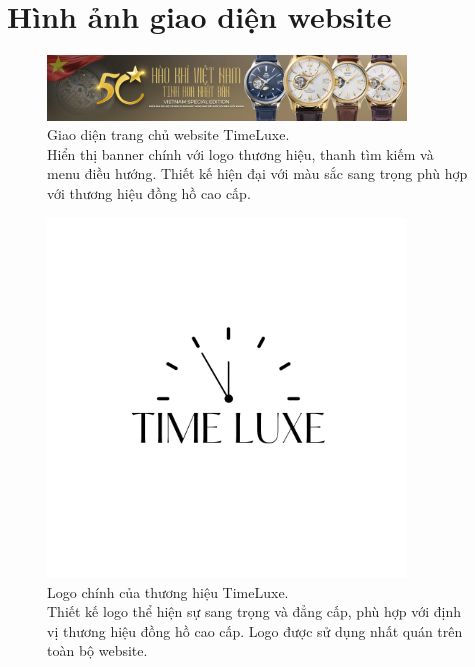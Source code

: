 \newpage
\section{Hình ảnh giao diện website}

\begin{figure}[htbp]
    \centering
    \includegraphics[width=0.85\textwidth]{static/banner2.webp}
    \caption[Giao diện trang chủ TimeLuxe]{Giao diện trang chủ website TimeLuxe. \protect\\
    Hiển thị banner chính với logo thương hiệu, thanh tìm kiếm và menu điều hướng. Thiết kế hiện đại với màu sắc sang trọng phù hợp với thương hiệu đồng hồ cao cấp.}
    \label{fig:homepage}
\end{figure}

\begin{figure}[htbp]
    \centering
    \includegraphics[width=0.85\textwidth]{static/logo TIME LUXE.png}
    \caption[Logo thương hiệu TimeLuxe]{Logo chính của thương hiệu TimeLuxe. \protect\\
    Thiết kế logo thể hiện sự sang trọng và đẳng cấp, phù hợp với định vị thương hiệu đồng hồ cao cấp. Logo được sử dụng nhất quán trên toàn bộ website.}
    \label{fig:logo}
\end{figure}


